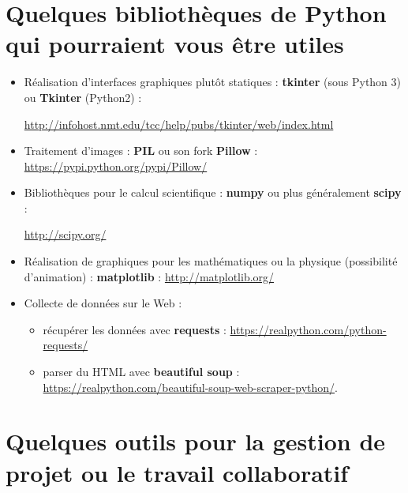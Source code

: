 \documentclass[a4paper, french, 12pt]{article}  %
\begin{document}
\section{Quelques bibliothèques de Python qui pourraient vous \^etre utiles}

\begin{itemize}[label=]



\item Réalisation d'interfaces graphiques plut\^ot statiques : \textbf{tkinter} (sous Python 3) ou \textbf{Tkinter} (Python2) :

\url{http://infohost.nmt.edu/tcc/help/pubs/tkinter/web/index.html}
\item Traitement d'images : \textbf{PIL} ou son fork \textbf{Pillow} : \url{https://pypi.python.org/pypi/Pillow/}

 \item Bibliothèques pour le calcul scientifique : \textbf{numpy} ou plus généralement \textbf{scipy} : 
 
 \url{http://scipy.org/}
 
 \item Réalisation de graphiques pour les mathématiques ou la physique (possibilité d'animation) : \textbf{matplotlib} :
  \url{http://matplotlib.org/}
 
\item Collecte de données sur le Web :

\begin{itemize}
\item  récupérer les données avec \textbf{requests} : \url{https://realpython.com/python-requests/} 
\item    \og{} parser \fg{} du HTML  avec \textbf{beautiful soup} : 
\url{https://realpython.com/beautiful-soup-web-scraper-python/}.
\end{itemize}

\end{itemize}


\section{Quelques outils pour la gestion de projet ou le travail collaboratif}
\end{document}
